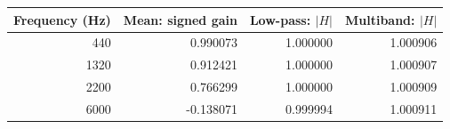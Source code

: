 \begin{tabular}{rrrr}
\toprule
Frequency (Hz) & Mean: signed gain & Low-pass: $|H|$ & Multiband: $|H|$ \\
\midrule
440 & 0.990073 & 1.000000 & 1.000906 \\
1320 & 0.912421 & 1.000000 & 1.000907 \\
2200 & 0.766299 & 1.000000 & 1.000909 \\
6000 & -0.138071 & 0.999994 & 1.000911 \\
\bottomrule
\end{tabular}

